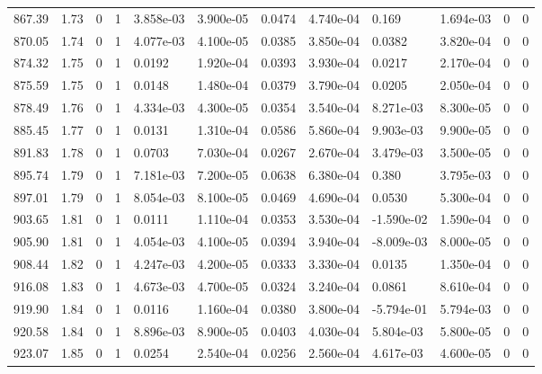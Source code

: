 \documentclass[preview]{standalone}
\begin{document}
{{{{{{{{{{{{{{{{{{\begin{tabular}{L{1.2cm}C{1.2cm} C{0.3cm}C{0.5cm} C{1.4cm}C{1.4cm} C{1.4cm}C{1.4cm} C{1.6cm}C{1.6cm} C{1.6cm}C{1.6cm}}
  867.39  &  1.73  & 0     &  1 &  3.858e-03  & 3.900e-05  &  0.0474&   4.740e-04& 0.169 & 1.694e-03   &  0 & 0  \\ 
  870.05  &  1.74  & 0     &  1 &  4.077e-03  & 4.100e-05  &  0.0385&   3.850e-04& 0.0382 & 3.820e-04   &  0 & 0  \\ 
  874.32  &  1.75  & 0     &  1 &  0.0192  & 1.920e-04  &  0.0393&   3.930e-04& 0.0217 & 2.170e-04   &  0 & 0  \\ 
  875.59  &  1.75  & 0     &  1 &  0.0148  & 1.480e-04  &  0.0379&   3.790e-04& 0.0205 & 2.050e-04   &  0 & 0  \\ 
  878.49  &  1.76  & 0     &  1 &  4.334e-03  & 4.300e-05  &  0.0354&   3.540e-04& 8.271e-03 & 8.300e-05   &  0 & 0  \\ 
  885.45  &  1.77  & 0     &  1 &  0.0131  & 1.310e-04  &  0.0586&   5.860e-04& 9.903e-03 & 9.900e-05   &  0 & 0  \\ 
  891.83  &  1.78  & 0     &  1 &  0.0703  & 7.030e-04  &  0.0267&   2.670e-04& 3.479e-03 & 3.500e-05   &  0 & 0  \\ 
  895.74  &  1.79  & 0     &  1 &  7.181e-03  & 7.200e-05  &  0.0638&   6.380e-04& 0.380 & 3.795e-03   &  0 & 0  \\ 
  897.01  &  1.79  & 0     &  1 &  8.054e-03  & 8.100e-05  &  0.0469&   4.690e-04& 0.0530 & 5.300e-04   &  0 & 0  \\ 
  903.65  &  1.81  & 0     &  1 &  0.0111  & 1.110e-04  &  0.0353&   3.530e-04& -1.590e-02 & 1.590e-04   &  0 & 0  \\ 
  905.90  &  1.81  & 0     &  1 &  4.054e-03  & 4.100e-05  &  0.0394&   3.940e-04& -8.009e-03 & 8.000e-05   &  0 & 0  \\ 
  908.44  &  1.82  & 0     &  1 &  4.247e-03  & 4.200e-05  &  0.0333&   3.330e-04& 0.0135 & 1.350e-04   &  0 & 0  \\ 
  916.08  &  1.83  & 0     &  1 &  4.673e-03  & 4.700e-05  &  0.0324&   3.240e-04& 0.0861 & 8.610e-04   &  0 & 0  \\ 
  919.90  &  1.84  & 0     &  1 &  0.0116  & 1.160e-04  &  0.0380&   3.800e-04& -5.794e-01 & 5.794e-03   &  0 & 0  \\ 
  920.58  &  1.84  & 0     &  1 &  8.896e-03  & 8.900e-05  &  0.0403&   4.030e-04& 5.804e-03 & 5.800e-05   &  0 & 0  \\ 
  923.07  &  1.85  & 0     &  1 &  0.0254  & 2.540e-04  &  0.0256&   2.560e-04& 4.617e-03 & 4.600e-05   &  0 & 0  \\ 
\hline 
\end{tabular} 

}}}}}}}}}}}}}}}}}}
\end{document}
